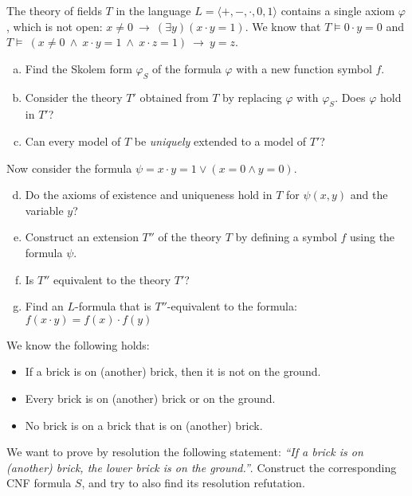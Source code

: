 \begin{problem}

    The theory of fields $T$ in the language $L=\langle +,-,\cdot,0,1\rangle$ contains a single axiom $\varphi$, which is not open: $x\neq 0\ \to\ (\exists y)(x\cdot y=1)$. We know that $T\models 0\cdot y=0$ and $T\models\ (x\ne 0\ \wedge\ x\cdot y=1\ \wedge\ x\cdot z=1)\ \to\ y=z$.
    \begin{enumerate}[(a)]
        \item Find the Skolem form $\varphi_S$ of the formula $\varphi$ with a new function symbol $f$.
        \item Consider the theory $T'$ obtained from $T$ by replacing $\varphi$ with $\varphi_S$. Does $\varphi$ hold in $T'$?
        \item Can every model of $T$ be \emph{uniquely} extended to a model of $T'$?
    \end{enumerate}
    Now consider the formula $\psi=x\cdot y=1\vee  (x=0 \wedge y=0)$.
    \begin{enumerate}[(a)]
        \setcounter{enumi}{3}
        \item Do the axioms of existence and uniqueness hold in $T$ for $\psi(x,y)$ and the variable $y$?
        \item Construct an extension $T''$ of the theory $T$ by defining a symbol $f$ using the formula $\psi$.
        \item Is $T''$ equivalent to the theory $T'$?
        \item Find an $L$-formula that is $T''$-equivalent to the formula:
        $f(x\cdot y)=f(x)\cdot f(y)$
    \end{enumerate}

\end{problem}


\medskip\begin{problem} We know the following holds:
    \begin{itemize}\it
        \item If a brick is on (another) brick, then it is not on the ground.
        \item Every brick is on (another) brick or on the ground.
        \item No brick is on a brick that is on (another) brick.
    \end{itemize}
    We want to prove by resolution the following statement: {\it ``If a brick is on (another) brick, the lower brick is on the ground.''}. Construct the corresponding CNF formula $S$, and try to also find its resolution refutation.
\end{problem}

